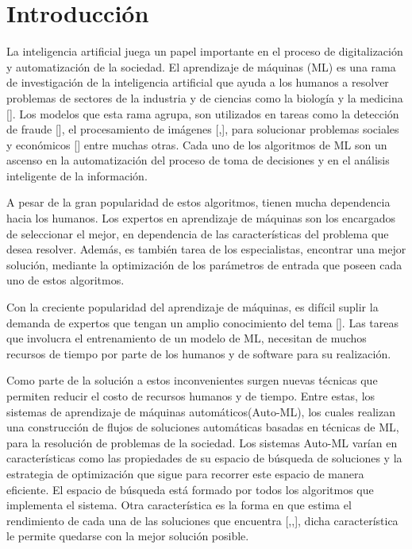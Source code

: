 \chapter*{Introducción}\label{chapter:introduction}
La inteligencia artificial juega un papel importante en el proceso de digitalización y automatización de la sociedad. El aprendizaje de máquinas (ML) es una rama de 
investigación de la inteligencia artificial que ayuda a los humanos a resolver problemas de sectores de la industria y de ciencias como la biología y la medicina 
[\cite{39}]. Los modelos que esta rama agrupa, son utilizados en tareas como la detección de fraude [\cite{4}], el procesamiento de imágenes [\cite{1},\cite{3}], 
para solucionar problemas sociales y económicos [\cite{2}] entre muchas otras. Cada uno de los algoritmos de ML son un ascenso en la automatización del proceso de 
toma de decisiones y en el análisis inteligente de la información. 

A pesar de la gran popularidad de estos algoritmos, tienen mucha dependencia hacia los humanos. Los expertos en aprendizaje de máquinas son los encargados 
de seleccionar el mejor, en dependencia de las características del problema que desea resolver. Además, es también tarea de los especialistas, encontrar 
una mejor solución, mediante la optimización de los parámetros de entrada que poseen cada uno de estos algoritmos. 

Con la creciente popularidad del aprendizaje de máquinas, es difícil suplir la demanda de expertos que tengan un amplio conocimiento del tema [\cite{33}]. 
Las tareas que involucra el entrenamiento de un modelo de ML, necesitan de muchos recursos de tiempo por parte de los humanos y de software para su realización.

Como parte de la solución a estos inconvenientes surgen nuevas técnicas que permiten reducir el costo de recursos humanos y de tiempo. Entre estas,
los sistemas de aprendizaje de máquinas automáticos(Auto-ML), los cuales realizan una construcción de flujos de soluciones automáticas basadas en técnicas de ML, 
para la resolución de problemas de la sociedad. Los sistemas Auto-ML varían en características como las propiedades de su espacio de búsqueda de soluciones y la 
estrategia de optimización que sigue para recorrer este espacio de manera eficiente. El espacio de búsqueda está formado por todos los algoritmos que 
implementa el sistema. Otra característica es la forma en que estima el rendimiento de cada una de las soluciones que encuentra [\cite{33},\cite{37},\cite{52}], dicha 
característica le permite quedarse con la mejor solución posible.

